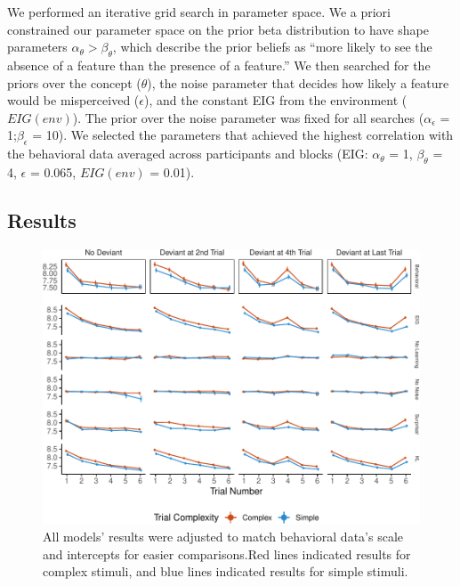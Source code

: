 \documentclass[10pt, letterpaper]{article}
\newenvironment{CodeChunk}{}{}
\begin{document}
We performed an iterative grid search in parameter space. We a priori
constrained our parameter space on the prior beta distribution to have
shape parameters \(\alpha_{\theta} > \beta_{\theta}\), which describe
the prior beliefs as ``more likely to see the absence of a feature than
the presence of a feature.'' We then searched for the priors over the
concept (\(\theta\)), the noise parameter that decides how likely a
feature would be misperceived (\(\epsilon\)), and the constant EIG from
the environment (\(EIG(env)\)). The prior over the noise parameter was
fixed for all searches (\(\alpha_{\epsilon}\) = 1;\(\beta_{\epsilon}\) =
10). We selected the parameters that achieved the highest correlation
with the behavioral data averaged across participants and blocks (EIG:
\(\alpha_{\theta}\) = 1, \(\beta_{\theta}\) = 4, \(\epsilon\) = 0.065,
\(EIG(env)\) = 0.01).

\hypertarget{results-1}{%
\subsection{Results}\label{results-1}}

\begin{CodeChunk}
\begin{figure}[t!]

{\centering \includegraphics{figs/experiment_res-1} 

}

\caption[All models’ results were adjusted to match behavioral data’s scale and intercepts for easier comparisons.Red lines indicated results for complex stimuli, and blue lines indicated results for simple stimuli]{All models’ results were adjusted to match behavioral data’s scale and intercepts for easier comparisons.Red lines indicated results for complex stimuli, and blue lines indicated results for simple stimuli.}\label{fig:experiment_res}
\end{figure}
\end{CodeChunk}
\end{document}

